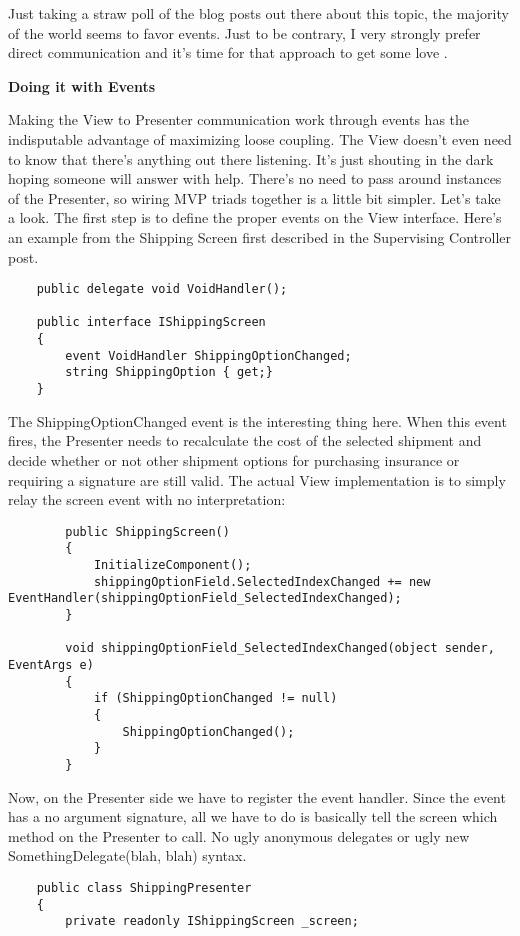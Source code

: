 \documentclass{article}
\begin{document}
{Just taking a straw poll of the blog posts out there about this topic, the majority of the world seems to favor events.  Just to be contrary, I very strongly prefer direct communication and it's time for that approach to get some love .

 
\Large {\textbf{Doing it with Events}}

Making the View to Presenter communication work through events has the indisputable advantage of maximizing loose coupling.  The View doesn't even need to know that there's anything out there listening.  It's just shouting in the dark hoping someone will answer with help.  There's no need to pass around instances of the Presenter, so wiring MVP triads together is a little bit simpler.  Let's take a look.  The first step is to define the proper events on the View interface.  Here's an example from the Shipping Screen first described in the Supervising Controller post.

 \begin{lstlisting}
    public delegate void VoidHandler();

    public interface IShippingScreen
    {
        event VoidHandler ShippingOptionChanged;
        string ShippingOption { get;}
    }
 \end{lstlisting}	

The ShippingOptionChanged event is the interesting thing here.  When this event fires, the Presenter needs to recalculate the cost of the selected shipment and decide whether or not other shipment options for purchasing insurance or requiring a signature are still valid.  The actual View implementation is to simply relay the screen event with no interpretation:
\newpage
 \begin{lstlisting}
        public ShippingScreen()
        {
            InitializeComponent();
            shippingOptionField.SelectedIndexChanged += new EventHandler(shippingOptionField_SelectedIndexChanged);
        }

        void shippingOptionField_SelectedIndexChanged(object sender, EventArgs e)
        {
            if (ShippingOptionChanged != null)
            {
                ShippingOptionChanged();
            }
        }
 \end{lstlisting}

Now, on the Presenter side we have to register the event handler.  Since the event has a no argument signature, all we have to do is basically tell the screen which method on the Presenter to call.  No ugly anonymous delegates or ugly new SomethingDelegate(blah, blah) syntax.
 \begin{lstlisting}
    public class ShippingPresenter
    {
        private readonly IShippingScreen _screen;


\end{lstlisting}}
\end{document}
